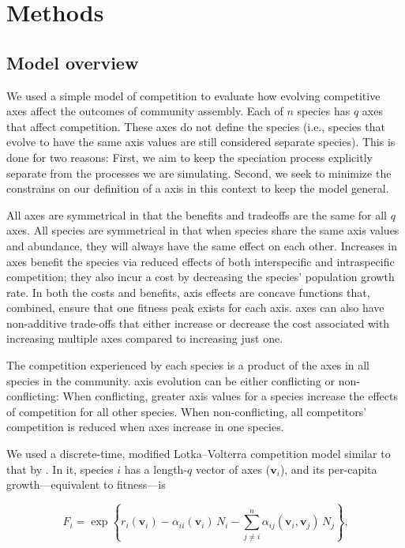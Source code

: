 
\section*{Methods}


\subsection*{Model overview}

We used a simple model of competition to evaluate how evolving competitive axes
affect the outcomes of community assembly.
Each of $n$ species has $q$ axes that affect competition.
These axes do not define the species (i.e., species that evolve to have
the same axis values are still considered separate species).
This is done for two reasons:
First, we aim to keep the speciation process explicitly
separate from the processes we are simulating.
Second, we seek to minimize the constrains on our definition of a axis
in this context to keep the model general.


All axes are symmetrical in that the benefits and tradeoffs are 
the same for all $q$ axes.
All species are symmetrical in that when species share the same axis values and abundance, 
they will always have the same effect on each other.
Increases in axes benefit the species via reduced
effects of both interspecific and intraspecific competition;
they also incur a cost by decreasing the species' population growth rate.
In both the costs and benefits, axis effects are concave functions that,
combined, ensure that one fitness peak exists for each axis.
axes can also have non-additive trade-offs that either increase or decrease
the cost associated with increasing multiple axes compared to increasing
just one.


The competition experienced by each species is a product of the axes in all
species in the community.
axis evolution can be either conflicting or non-conflicting:
When conflicting, greater axis values for a species increase the effects of
competition for all other species.
When non-conflicting, all competitors' competition is reduced when axes
increase in one species.


We used a discrete-time, modified Lotka--Volterra competition model similar to
that by \citet{Northfield:2013if}.
In it, species $i$ has a length-$q$ vector of axes ($\mathbf{v}_i$), and
its per-capita growth---equivalent to fitness---is

\begin{equation} \label{eq:fitness}
    F_{i} = \exp \left\{ r_i(\mathbf{v}_i) - 
        \alpha_{ii}(\mathbf{v}_i) \, N_i - \sum_{j \ne i}^{n}{
            \alpha_{ij}(\mathbf{v}_i, \mathbf{v}_j) \, N_j}  
    \right\}\textrm{,}
\end{equation}

